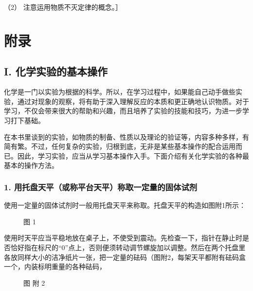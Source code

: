 （2） 注意运用物质不灭定律的概念。］

\chapter{附录}

\section{I. 化学实验的基本操作}\label{i.-ux5316ux5b66ux5b9eux9a8cux7684ux57faux672cux64cdux4f5c}

化学是一门以实验为根据的科学。所以，在学习过程中，如果能自己动手做些实验，通过对现象的观察，将有助于深入理解反应的本质和更正确地认识物质。对于学习，不仅会带来很大的帮助和兴趣，而且培养了实验的技能和技巧，为进一步学习打下基础。

在本书里谈到的实验，如物质的制备、性质以及理论的验证等，内容多种多样，有简有繁。不过，任何复杂的实验，归根到底，无非是某些基本操作的配合运用而已。因此，学习实验，应当从学习基本操作入手。下面介绍有关化学实验的各种最基本的操作方法。

\subsection{1. 用托盘天平（或称平台天平）称取一定量的固体试剂}

使用一定量的固体试剂时一般用托盘天平来称取。托盘天平的构造如图附1所示：

\begin{figure}
\centering
\caption{图 1}
\end{figure}

使用时天平应当平稳地放在桌子上，不使受到震动。先检查一下，指针在静止时是否恰好指在标尺的``0''点上，否则便须转动调节螺旋加以调整。然后在两个托盘里各放同样大小的洁净纸片一张，把一定量的砝码（图附2，每架天平都附有砝码盒一个，内装标明重量的各种砝码，

\begin{figure}
\centering
\caption{图 附 2}
\end{figure}

